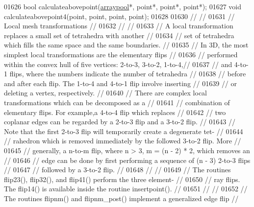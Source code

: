 \begin{DoxyCode}
01626   \textcolor{keywordtype}{bool} calculateabovepoint(\hyperlink{classtetgenmesh_1_1arraypool}{arraypool}*, point*, point*, point*);
01627   \textcolor{keywordtype}{void} calculateabovepoint4(point, point, point, point);
01628 
01630 \textcolor{comment}{//                                                                           //}
01631 \textcolor{comment}{// Local mesh transformations                                                //}
01632 \textcolor{comment}{//                                                                           //}
01633 \textcolor{comment}{// A local transformation replaces a small set of tetrahedra with another    //}
01634 \textcolor{comment}{// set of tetrahedra which fills the same space and the same boundaries.     //}
01635 \textcolor{comment}{//   In 3D, the most simplest local transformations are the elementary flips //}
01636 \textcolor{comment}{// performed within the convex hull of five vertices: 2-to-3, 3-to-2, 1-to-4,//}
01637 \textcolor{comment}{// and 4-to-1 flips,  where the numbers indicate the number of tetrahedra    //}
01638 \textcolor{comment}{// before and after each flip.  The 1-to-4 and 4-to-1 flip involve inserting //}
01639 \textcolor{comment}{// or deleting a vertex, respectively.                                       //}
01640 \textcolor{comment}{//   There are complex local transformations which can be decomposed as a    //}
01641 \textcolor{comment}{// combination of elementary flips. For example,a 4-to-4 flip which replaces //}
01642 \textcolor{comment}{// two coplanar edges can be regarded by a 2-to-3 flip and a 3-to-2 flip.    //}
01643 \textcolor{comment}{// Note that the first 2-to-3 flip will temporarily create a degenerate tet- //}
01644 \textcolor{comment}{// rahedron which is removed immediately by the followed 3-to-2 flip.  More  //}
01645 \textcolor{comment}{// generally, a n-to-m flip, where n > 3, m = (n - 2) * 2, which removes an  //}
01646 \textcolor{comment}{// edge can be done by first performing a sequence of (n - 3) 2-to-3 flips   //}
01647 \textcolor{comment}{// followed by a 3-to-2 flip.                                                //}
01648 \textcolor{comment}{//                                                                           //}
01649 \textcolor{comment}{// The routines flip23(), flip32(), and flip41() perform the three element-  //}
01650 \textcolor{comment}{// ray flips. The flip14() is available inside the routine insertpoint().    //}
01651 \textcolor{comment}{//                                                                           //}
01652 \textcolor{comment}{// The routines flipnm() and flipnm\_post() implement a generalized edge flip //}

\end{DoxyCode}
